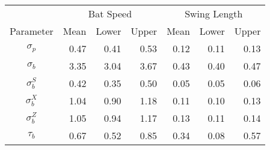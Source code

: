 \begin{tabular}{c|rrr|rrr|}
    & \multicolumn{3}{c|}{Bat Speed}          & \multicolumn{3}{c|}{Swing Length}  \\
  Parameter & Mean  & Lower  & Upper & Mean  & Lower  & Upper \\
  \hline
  $\sigma_p$ & 0.47 & 0.41 & 0.53 & 0.12 & 0.11 & 0.13 \\
  $\sigma_b$ & 3.35 & 3.04 & 3.67 & 0.43 & 0.40 & 0.47 \\
  $\sigma_b^S$ & 0.42 & 0.35 & 0.50 & 0.05 & 0.05 & 0.06 \\
  $\sigma_b^X$ & 1.04 & 0.90 & 1.18 & 0.11 & 0.10 & 0.13 \\
  $\sigma_b^Z$ & 1.05 & 0.94 & 1.17 & 0.13 & 0.11 & 0.14 \\
  $\tau_b$ & 0.67 & 0.52 & 0.85 & 0.34 & 0.08 & 0.57 \\
\end{tabular}